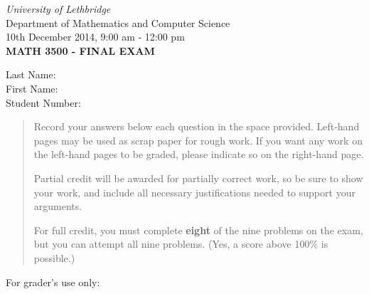 \documentclass[12pt]{article}
\newcommand{\skipline}{\vspace{12pt}}
\begin{document}
\author{Instructor: Sean Fitzpatrick}
\thispagestyle{plain}
\begin{center}
\emph{University of Lethbridge}\\
Department of Mathematics and Computer Science\\
10th December 2014, 9:00 am - 12:00 pm\\
{\bf MATH 3500 - FINAL EXAM}\\
\end{center}
\skipline \skipline \skipline \noindent \skipline
Last Name:\underline{\hspace{350pt}}\\
\skipline
First Name:\underline{\hspace{348pt}}\\
\skipline
Student Number:\underline{\hspace{322pt}}\\
\skipline

\vspace{0.5in}


\begin{quote}

 
 Record your answers below each question in the space provided.    Left-hand pages may be used as scrap paper for rough work.  If you want any work on the left-hand pages to be graded, please indicate so on the right-hand page.
 
 \bigskip
 
Partial credit will be awarded for partially correct work, so be sure to show your work, and include all necessary justifications needed to support your arguments. 

\bigskip

For full credit, you must complete {\bf eight} of the nine problems on the exam, but you can attempt all nine problems. (Yes, a score above 100\% is possible.)

\end{quote}


\vspace{0.25in}

For grader's use only:
\end{document}
